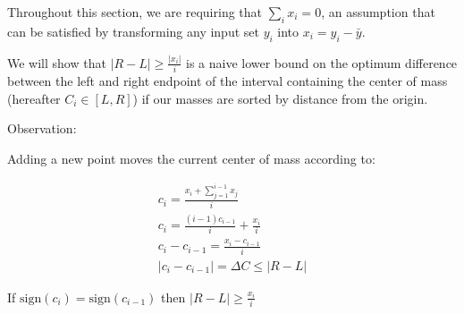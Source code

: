 Throughout this section, we are requiring that $ \sum_i x_i = 0 $, an assumption that can be satisfied by transforming any input set $ y_i $ into $ x_i = y_i - \bar{y}$. 

We will show that $|R-L| \geq \frac{|x_i|}{i} $ is a naive lower bound on the optimum difference between the left and right endpoint of the interval containing the center of mass (hereafter $ C_i \in [ L, R ] $) if our masses are sorted by distance from the origin. 

Observation:

Adding a new point moves the current center of mass according to:

\begin{eqnarray*}
c_i = \frac{ x_i + \sum_{j=1}^{i-1} x_j }{ i } \\ 
c_i = \frac{ (i-1) c_{i-1}}{i} + \frac{x_i }{ i }  \\
c_i - c_{i-1} = \frac{x_i - c_{i - 1} }{ i } \\
|c_i - c_{i-1}| = \Delta C \leq |R - L|
\end{eqnarray*}

\begin{lem} \label{lem:matchSignNaive}
If $\textrm{sign}(c_i) = \textrm{sign}(c_{i-1})$ then $|R - L| \geq \frac{x_i}{i}$
\end{lem}

